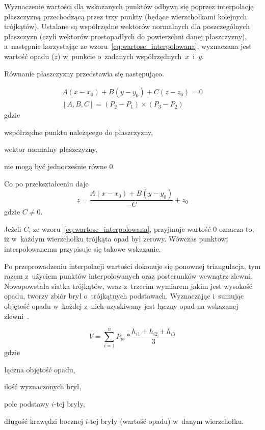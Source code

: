 Wyznaczenie wartości dla wskazanych punktów odbywa się poprzez interpolację płaszczyzną przechodzącą przez trzy punkty (będące wierzchołkami kolejnych trójkątów). Ustalane są współrzędne wektorów normalnych dla poszczególnych płaszczyzn (czyli wektorów prostopadłych do powierzchni danej płaszczyzny), a~następnie korzystając ze wzoru~\ref{eq:wartosc_interpolowana}, wyznaczana jest wartość opadu ($z$) w~punkcie o~zadanych współrzędnych~$x$~i~$y$.

Równanie płaszczyzny przedstawia się następująco.

\begin{equation}
\begin{gathered}
A(x - x_0) + B(y - y_0) + C(z - z_0) = 0 \\
[A, B, C] = (P_2 - P_1) \times (P_3 - P_2)
\label{eq:rownanie_plaszczyzny}
\end{gathered}
\end{equation}
gdzie
\begin{description}[leftmargin=3cm, itemsep=0cm, labelsep=0cm]
	\item[$x_0, y_0, z_0$] współrzędne punktu należącego do płaszczyzny,
	\item[{[}$A, B, C${]}] wektor normalny płaszczyzny, %
	\item[$A, B, C$] nie mogą być jednocześnie równe 0.
\end{description}
%
Co po przekształceniu daje
\begin{equation}
\label{eq:wartosc_interpolowana}
	z = \frac{A(x - x_0) + B(y - y_0)}{-C} + z_0
\end{equation}
gdzie $C \neq 0$.


Jeżeli $C$, ze wzoru~\ref{eq:wartosc_interpolowana}, przyjmuje wartość 0 oznacza to, iż w~każdym wierzchołku trójkąta opad był zerowy. Wówczas punktowi interpolowanemu przypisuje się takowe wskazanie.

Po przeprowadzeniu interpolacji wartości dokonuje się ponownej triangulacja, tym razem z~użyciem punktów interpolowanych oraz posterunków wewnątrz zlewni. Nowopowstała siatka trójkątów, wraz z~trzecim wymiarem jakim jest wysokość opadu, tworzy zbiór brył o~trójkątnych podstawach. Wyznaczając i~sumując objętość opadu w~każdej z~nich uzyskiwany jest łączny opad na wskazanej zlewni~\cite{matematyka_poradnik, mathMonthly}.

\begin{equation}
	V = \sum_{i=1}^{n}P_{pi}*\frac{h_{i1}+h_{i2}+h_{i3}}{3}
\label{eq:opad_powierzchniowy}
\end{equation}
gdzie
\begin{description}[leftmargin=3cm, itemsep=0cm, labelsep=0cm]
	\item[$V$] łączna objętość opadu,
	\item[$n$] ilość wyznaczonych brył,
	\item[$P_{pi}$] pole podstawy $i$-tej bryły,
	\item[$h_{i1}, h_{i2}, h_{i3}$] długość krawędzi bocznej $i$-tej bryły (wartość opadu) w~danym wierzchołku.
\end{description}




